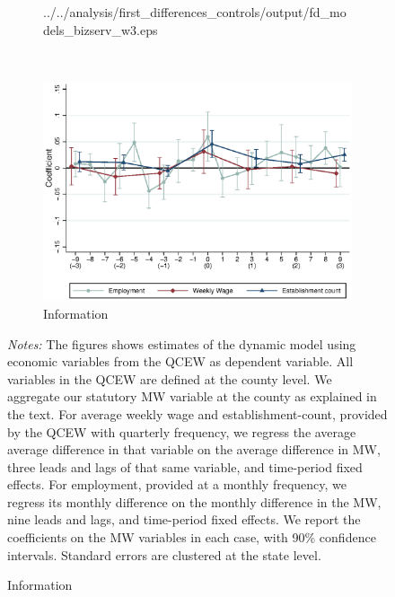 \begin{figure}[htb!]
\begin{subfigure}[b]{.55\textwidth}
			{../../analysis/first_differences_controls/output/fd_models_bizserv_w3.eps}
	\end{subfigure}\\
	\begin{subfigure}[b]{.55\textwidth}
		\caption{Information}
		\includegraphics[width = \textwidth]
			{../../analysis/first_differences_controls/output/fd_models_info_w3.eps}
	\end{subfigure}
	\begin{minipage}{0.95\textwidth}\footnotesize
		\vspace{3mm}	
		\textit{Notes:} The figures shows estimates of the dynamic model using economic variables 
		from the QCEW as dependent variable. All variables in the QCEW are defined at the county level.
		We aggregate our statutory MW variable at the county as explained in the text. For average weekly 
		wage and establishment-count, provided by the QCEW with quarterly frequency, we regress the average 
		average difference in that variable on the average difference in MW, three leads and lags of that
		same variable, and time-period fixed effects. For employment, provided at a monthly frequency, we 
		regress its monthly difference on the monthly difference in the MW, nine leads and lags, and 
		time-period fixed effects. We report the coefficients on the MW variables in each case, with 90\%
		confidence intervals. Standard errors are clustered at the state level.
	\end{minipage}
\end{figure}

